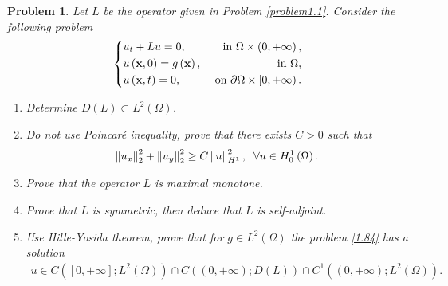 \documentclass[11pt,a4paper]{article}
\numberwithin{equation}{section}
\numberwithin{equation}{section}
\newtheorem{problem}{Problem}[section]
\begin{document}
\begin{problem}
Let $L$ be the operator given in Problem \ref{problem1.1}. Consider the following problem
\begin{equation}
\label{1.84}
\left\{ \begin{split}
& {u_t} + Lu = 0,  & \mbox{ in } \Omega  \times \left( {0, + \infty } \right),\\
& u\left( {{\bf{x}},0} \right) = g\left( {\bf{x}} \right), & \mbox{ in } \Omega ,\\
& u \left({\bf{x}},t\right)= 0, & \mbox{ on } \partial \Omega \times \left[0,+\infty\right).
\end{split} \right.
\end{equation}
\begin{enumerate}
\item Determine $D\left( L \right) \subset {L^2}\left(\Omega\right)$.
\item Do not use Poincar\'e inequality, prove that there exists $C>0$ such that
\begin{align}
\label{1.85}
\left\| {{u_x}} \right\|_2^2 + \left\| {{u_y}} \right\|_2^2 \ge C\left\| u \right\|_{{H^1}}^2,\hspace{0.2cm} \forall u \in H_0^1 \left(\Omega\right).
\end{align}
\item Prove that the operator $L$ is maximal monotone.
\item Prove that $L$ is symmetric, then deduce that $L$ is self-adjoint.
\item Use Hille-Yosida theorem, prove that for $g\in L^2\left(\Omega\right)$ the problem \eqref{1.84} has a solution
\begin{align}
u \in C\left( {\left[ {0, + \infty } \right];{L^2}\left(\Omega\right)} \right) \cap C\left( {\left( {0, + \infty } \right);D\left( L \right)} \right) \cap {C^1}\left( {\left( {0, + \infty } \right);{L^2}\left(\Omega\right)} \right).
\end{align}
\end{enumerate}
\end{problem}
\end{document}
